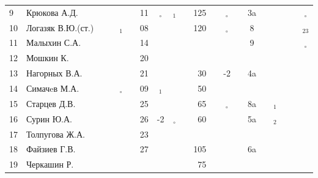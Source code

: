 \documentclass[a4paper,landscape,11pt]{article}
\newcommand*\OK{&\small \ding{51}$\!\!_\circ$} %
\newcommand*\Ok{&\small \ding{51}$\!\!_\circ$} %
\newcommand*\ok{&{\small\ding{51}}} %
\newcommand*\no{&{\small }} %
\newcommand*\da{&{\small\ding{48}$\!\!_1$}} %
\newcommand*\db{&{\small\ding{48}$\!\!_2$}} %
\newcommand*\bc{&{\small\ding{48}$\!\!_{23}$}} %
\begin{document}
\begin{tabular}{l|l|ccccccccrccccccccc}
 9& Крюкова А.Д.     \ok\ok\ok\ok&11\OK\da\ok&125\ok\Ok\ok& 3a\ok\ok\ok\ok\Ok\\
10& Логазяк В.Ю.(ст.)\ok\ok\da\ok&08\no\ok\ok&120\ok\Ok\ok&  8\ok\ok\ok\ok\bc\\
\midrule
11& Малыхин С.А.     \ok\no\ok\ok&14\no\no\no \no\no\ok\ok&  9\no\no\no\ok\Ok\\
12& Мошкин К.        \ok\ok\ok\ok&20\ok\no\no \no\no\no\ok \no\no\no\no\no\no\\
13& Нагорных В.А.    \ok\ok\ok\ok&21\ok\ok\ok& 30\ok&-2\ok& 4a\ok\ok\ok\ok\ok\\
14& Симачeв М.А.     \ok\ok\OK\ok&09\da\no\no& 50\no\no\no \no\no\ok\ok\ok\no\\
15& Старцев Д.В.     \ok\ok\ok\ok&25\ok\ok\ok& 65\ok\Ok\ok& 8a\ok\da\ok\ok\ok\\
16& Сурин Ю.А.       \ok\ok\ok\ok&26&-2\OK\ok& 60\ok\ok\ok& 5a\ok\db\ok\ok\no\\
17& Толпугова Ж.А.   \no\no\no\no&23\ok\no\no \no\no\no\no \no\no\ok\ok\no\ok\\
18& Файзиев Г.В.     \ok\ok\ok\ok&27\ok\ok\ok&105\ok\ok\ok& 6a\ok\no\ok\ok\ok\\
19& Черкашин Р.      \ok\ok\ok\ok\no\no\no\no& 75\no\ok\ok \no\no\no\no\no\no\\ 
\bottomrule
\end{tabular} 
\end{document}
